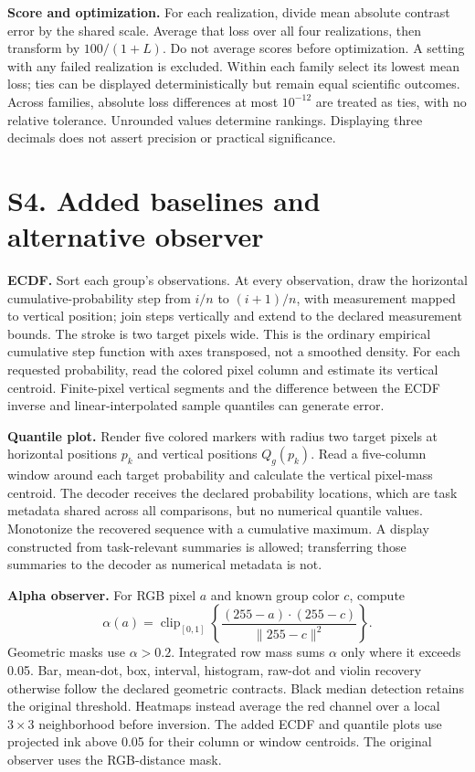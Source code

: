 \documentclass[10pt]{article}
\begin{document}
\textbf{Score and optimization.} For each realization, divide mean absolute contrast error by the shared scale. Average that loss over all four realizations, then transform by $100/(1+L)$. Do not average scores before optimization. A setting with any failed realization is excluded. Within each family select its lowest mean loss; ties can be displayed deterministically but remain equal scientific outcomes. Across families, absolute loss differences at most $10^{-12}$ are treated as ties, with no relative tolerance. Unrounded values determine rankings. Displaying three decimals does not assert precision or practical significance.


\section*{S4. Added baselines and alternative observer}
\textbf{ECDF.} Sort each group's observations. At every observation, draw the horizontal cumulative-probability step from $i/n$ to $(i+1)/n$, with measurement mapped to vertical position; join steps vertically and extend to the declared measurement bounds. The stroke is two target pixels wide. This is the ordinary empirical cumulative step function with axes transposed, not a smoothed density. For each requested probability, read the colored pixel column and estimate its vertical centroid. Finite-pixel vertical segments and the difference between the ECDF inverse and linear-interpolated sample quantiles can generate error.

\textbf{Quantile plot.} Render five colored markers with radius two target pixels at horizontal positions $p_k$ and vertical positions $Q_g(p_k)$. Read a five-column window around each target probability and calculate the vertical pixel-mass centroid. The decoder receives the declared probability locations, which are task metadata shared across all comparisons, but no numerical quantile values. Monotonize the recovered sequence with a cumulative maximum. A display constructed from task-relevant summaries is allowed; transferring those summaries to the decoder as numerical metadata is not.

\textbf{Alpha observer.} For RGB pixel $a$ and known group color $c$, compute
\[
\alpha(a)=\operatorname{clip}_{[0,1]}\left\{\frac{(255-a)\cdot(255-c)}{\|255-c\|^2}\right\}.
\]
Geometric masks use $\alpha>0.2$. Integrated row mass sums $\alpha$ only where it exceeds 0.05. Bar, mean-dot, box, interval, histogram, raw-dot and violin recovery otherwise follow the declared geometric contracts. Black median detection retains the original threshold. Heatmaps instead average the red channel over a local $3\times3$ neighborhood before inversion. The added ECDF and quantile plots use projected ink above 0.05 for their column or window centroids. The original observer uses the RGB-distance mask.
\end{document}
